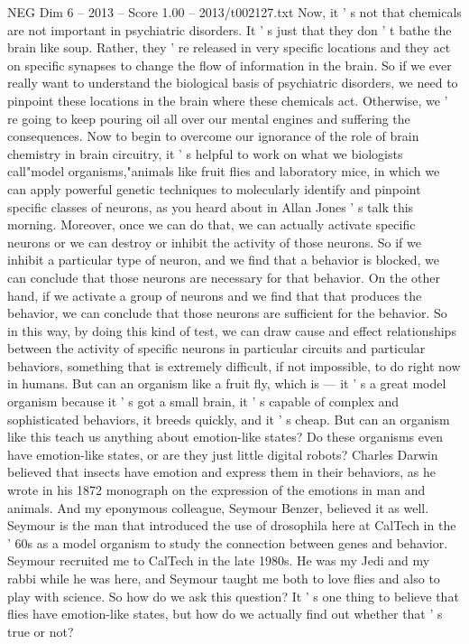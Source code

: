\begin{textsample}{NEG Dim 6 – 2013 – Score 1.00 – 2013/t002127.txt}
Now, it ' s not that chemicals are not important in psychiatric disorders.
It ' s just that they don ' t bathe the brain like soup.
Rather, they ' re released in very specific locations and they act on specific synapses to change the flow of information in the brain.
So if we ever really want to understand the biological basis of psychiatric disorders, we need to pinpoint these locations in the brain where these chemicals act.
Otherwise, we ' re going to keep pouring oil all over our mental engines and suffering the consequences.
Now to begin to overcome our ignorance of the role of brain chemistry in brain circuitry, it ' s helpful to work on what we biologists call"model organisms,"animals like fruit flies and laboratory mice, in which we can apply powerful genetic techniques to molecularly identify and pinpoint specific classes of neurons, as you heard about in Allan Jones ' s talk this morning.
Moreover, once we can do that, we can actually activate specific neurons or we can destroy or inhibit the activity of those neurons.
So if we inhibit a particular type of neuron, and we find that a behavior is blocked, we can conclude that those neurons are necessary for that behavior.
On the other hand, if we activate a group of neurons and we find that that produces the behavior, we can conclude that those neurons are sufficient for the behavior.
So in this way, by doing this kind of test, we can draw cause and effect relationships between the activity of specific neurons in particular circuits and particular behaviors, something that is extremely difficult, if not impossible, to do right now in humans.
But can an organism like a fruit fly, which is — it ' s a great model organism because it ' s got a small brain, it ' s capable of complex and sophisticated behaviors, it breeds quickly, and it ' s cheap.
But can an organism like this teach us anything about emotion-like states?
Do these organisms even have emotion-like states, or are they just little digital robots?
Charles Darwin believed that insects have emotion and express them in their behaviors, as he wrote in his 1872 monograph on the expression of the emotions in man and animals.
And my eponymous colleague, Seymour Benzer, believed it as well.
Seymour is the man that introduced the use of drosophila here at CalTech in the ' 60s as a model organism to study the connection between genes and behavior.
Seymour recruited me to CalTech in the late 1980s.
He was my Jedi and my rabbi while he was here, and Seymour taught me both to love flies and also to play with science.
So how do we ask this question?
It ' s one thing to believe that flies have emotion-like states, but how do we actually find out whether that ' s true or not?

\end{textsample}
